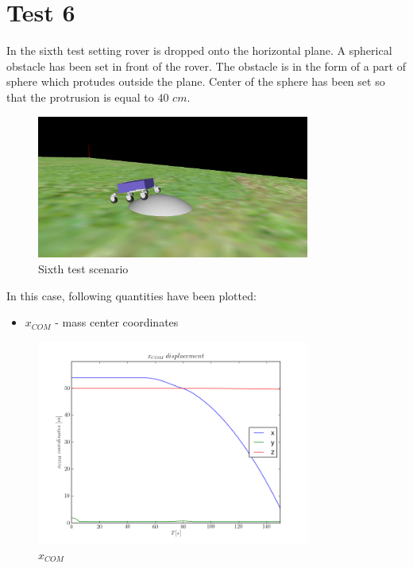 \newpage
\section{Test 6}
\label{Sec:test_6}

In the sixth test setting rover is dropped onto the horizontal plane.
A spherical obstacle has been set in front of the rover. The obstacle is in the form of a part of sphere which protudes outside the plane.
Center of the sphere has been set so that the protrusion is equal to $40$ $cm$.

\begin{figure}[H]
  \centering
    \includegraphics[width=0.8\textwidth]{run_6}
  \caption{Sixth test scenario}
\end{figure}

\noindent In this case, following quantities have been plotted:

\begin{itemize}
  \item $x_{COM}$ - mass center coordinates
\end{itemize}

\begin{figure}[H]
  \centering
    \includegraphics[width=0.8\textwidth]{xCOM6}
  \caption{$x_{COM}$}
\end{figure}

